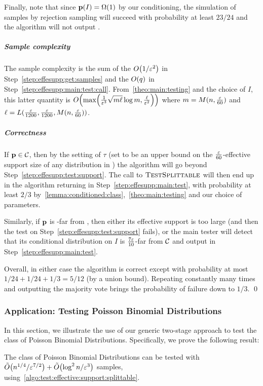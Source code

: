 Finally, note that since $\D(I) = \bigOmega{1}$ by our conditioning, the simulation of samples by rejection sampling will succeed with probability at least $23/24$ and the algorithm will not output \fail.

\subparagraph{Sample complexity}
The sample complexity is the sum of the $\bigO{1/\eps^2}$ in Step~\ref{step:effesupp:get:samples} and the $\bigO{q}$ in Step~\ref{step:effesupp:main:test:call}. From~\cref{theo:main:testing} and the choice of $I$, this latter quantity is $\bigO{ \max\mleft(\frac{1}{\eps^3} \sqrt{m\ell} \log m, \frac{\ell}{\eps^2}\mright) }$ where $m = M(n,\frac{\varepsilon}{60})$ and $\ell=L(\frac{\varepsilon}{1200},\frac{\varepsilon}{1200}, M(n,\frac{\varepsilon}{60}))$.

\subparagraph{Correctness} If $\mathbf{p}\in\mathcal{C}$, then by the setting of $\tau$ (set to be an upper bound on the $\frac{\varepsilon}{60}$-effective support size of any distribution in \class) the algorithm will go beyond Step~\ref{step:effesupp:test:support}. The call to $\textsc{TestSplittable}$ will then end up in the algorithm returning \accept in Step~\ref{step:effesupp:main:test}, with probability at least $2/3$ by~\cref{lemma:conditioned:class},~\cref{theo:main:testing} and our choice of parameters.

Similarly, if $\mathbf{p}$ is \eps-far from \class, then either its effective support is too large (and then the test on Step~\ref{step:effesupp:test:support} fails), or the main tester will detect that its conditional distribution on $I$ is $\frac{7\varepsilon}{10}$-far from $\mathcal{C}$ and output \reject in Step~\ref{step:effesupp:main:test}.

Overall, in either case the algorithm is correct except with probability at most $1/24+1/24+1/3=5/12$ (by a union bound). Repeating constantly many times and outputting the majority vote brings the probability of failure down to $1/3$. \qed

\subsubsection{Application: Testing Poisson Binomial Distributions}\label{ssec:testing:pbds}

In this section, we illustrate the use of our generic two-stage approach to test the class of Poisson Binomial Distributions. Specifically, we prove the following result:
\begin{corollary}\label{coro:main:testing:effective:support:pbd}
The class of Poisson Binomial Distributions can be tested with $\tildeO{{n}^{1/4}/\eps^{7/2}} + \tildeO{\log^2 n/\eps^3 }$ samples, using~\cref{algo:test:effective:support:splittable}.
\end{corollary}

